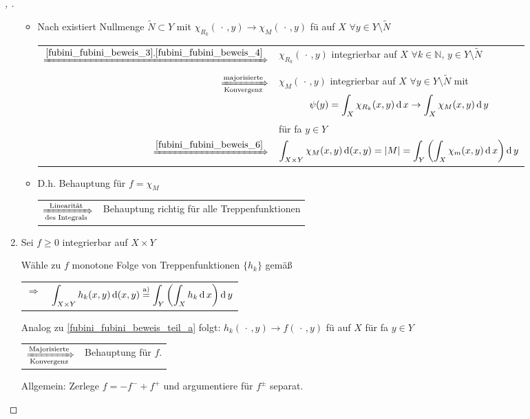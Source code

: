 \begin{proof}[, ]
\begin{enumerate}[label={\alph*)},topsep=\dimexpr-\baselineskip/2\relax]
\begin{itemize}
		\item Nach  existiert Nullmenge $\tilde{N}\subset Y$ mit $\chi_{R_k}(\,\cdot\, , y)\to \chi_M(\,\cdot \, , y)$ \gls{fü} auf $X$ $\forall y\in Y\setminus\tilde{N}$ \\
		\begin{tabularx}{\linewidth}{r@{\ \ }X}
		$\xRightarrow{\eqref{fubini_fubini_beweis_3},\eqref{fubini_fubini_beweis_4}}$ & $\chi_{R_k} (\,\cdot\, , y)$ integrierbar auf $X$ $\forall k\in \mathbb{N}$, $y\in Y\setminus\tilde{N}$ \\
		$\xRightarrow[\text{Konvergenz}]{\text{majorisierte}}$ & $\chi_M(\,\cdot\, ,y)$ integrierbar auf $X$ $\forall y\in Y\setminus\tilde{N}$ mit
		\[\psi(y) = \int_X \chi_{R_k}(x,y)\operatorname{d} x \to \int_X \chi_M (x,y) \operatorname{d} y\] für \gls{fa} $y\in Y$ \\
		$\xRightarrow{\eqref{fubini_fubini_beweis_6}}$&  $\displaystyle \int_{X\times Y} \chi_M (x,y) \operatorname{d} (x,y) = \vert M \vert = \int_Y \left( \int_X \chi_m (x,y) \operatorname{d} x\right) \operatorname{d} y$
		\end{tabularx}
		
		\item D.h. Behauptung für $f=\chi_M$ \\ \begin{tabularx}{\linewidth}{r@{\ \ }X}
		$\xRightarrow[\text{des Integrals}]{\text{Linearität}}$ & Behauptung richtig für alle Treppenfunktionen
		\end{tabularx}
		\end{itemize}
		\item Sei $f\ge 0$ integrierbar auf $X\times Y$
		
		Wähle zu $f$ monotone Folge von Treppenfunktionen $\{ h_k\}$ gemäß  \\ \begin{tabularx}{\linewidth}{r@{\ \ }X}
		$\Rightarrow$ & $\displaystyle \int_{X\times Y} h_k(x,y) \operatorname{d} (x,y) \overset{\text{a)}}{=} \int_Y \left( \int_X h_k \operatorname{d} x\right) \operatorname{d} y$
		\end{tabularx}
		
		Analog zu \ref{fubini_fubini_beweis_teil_a} folgt: $h_k(\,\cdot\, , y)\to f(\,\cdot\,,y)$ \gls{fü} auf $X$ für \gls{fa} $y\in Y$ \\ \begin{tabularx}{\linewidth}{r@{\ \ }X}
		$\xRightarrow[\text{Konvergenz}]{\text{Majorisierte}}$ & Behauptung für $f$.
		\end{tabularx}
		
		Allgemein: Zerlege $f = -f^- + f^+$ und argumentiere für $f^\pm$ separat.
	\end{enumerate}
\end{proof}

